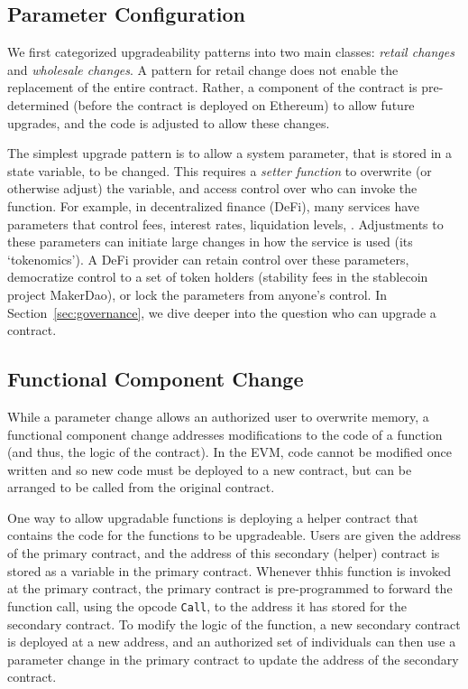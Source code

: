 
\subsection{Parameter Configuration}
\label{sec:parameter}

We first categorized upgradeability patterns into two main classes: \textit{retail changes} and \textit{wholesale changes}. A pattern for retail change does not enable the replacement of the entire contract. Rather, a component of the contract is pre-determined (before the contract is deployed on Ethereum) to allow future upgrades, and the code is adjusted to allow these changes. 

The simplest upgrade pattern is to allow a system parameter, that is stored in a state variable, to be changed. This requires a \textit{setter function} to overwrite (or otherwise adjust) the variable, and access control over who can invoke the function. For example, in decentralized finance (DeFi), many services have parameters that control fees, interest rates, liquidation levels, \etc. Adjustments to these parameters can initiate large changes in how the service is used (its `tokenomics'). A DeFi provider can retain control over these parameters, democratize control to a set of token holders (\eg stability fees in the stablecoin project MakerDao), or lock the parameters from anyone's control. In Section~\ref{sec:governance}, we dive deeper into the question who can upgrade a contract. 


\subsection{Functional Component Change}
\label{sec:component}

While a parameter change allows an authorized user to overwrite memory, a functional component change addresses modifications to the code of a function (and thus, the logic of the contract). In the EVM, code cannot be modified once written and so new code must be deployed to a new contract, but can be arranged to be called from the original contract. 

One way to allow upgradable functions is deploying a helper contract that contains the code for the functions to be upgradeable. Users are given the address of the primary contract, and the address of this secondary (helper) contract is stored as a variable in the primary contract. Whenever thhis function is invoked at the primary contract, the primary contract is pre-programmed to forward the function call, using the opcode \texttt{Call}, to the address it has stored for the secondary contract. To modify the logic of the function, a new secondary contract is deployed at a new address, and an authorized set of individuals can then use a parameter change in the primary contract to update the address of the secondary contract.

